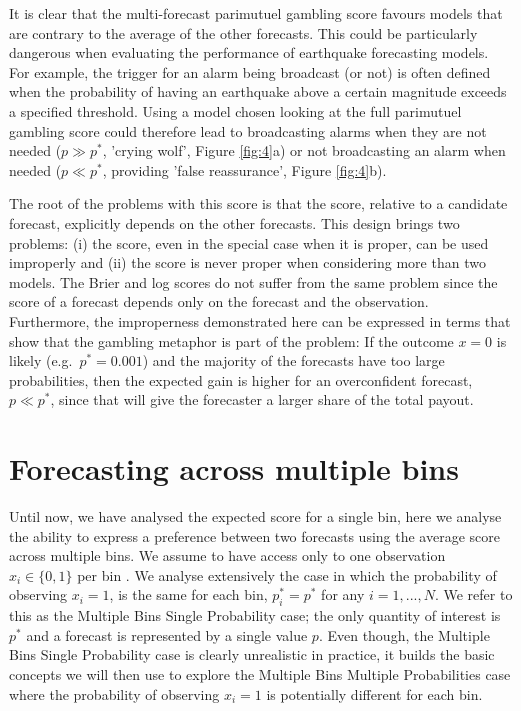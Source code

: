 \documentclass[referee,sn-basic]{sn-jnl}
\theoremstyle{thmstyleone}%
\theoremstyle{thmstyletwo}%
\theoremstyle{thmstylethree}%
\begin{document}
It is clear that the multi-forecast parimutuel gambling score favours models that are contrary to the average of the other forecasts. This could be particularly dangerous when evaluating the performance of earthquake forecasting models. For example, the trigger for an alarm being broadcast (or not) is often defined when the probability of having an earthquake above a certain magnitude exceeds a specified threshold. Using a model chosen looking at the full parimutuel gambling score could therefore lead to broadcasting alarms when they are not needed ($p\gg p^*$, 'crying wolf', Figure \ref{fig:4}a) or not broadcasting an alarm when needed ($p\ll p^*$, providing 'false reassurance', Figure \ref{fig:4}b).

The root of the problems with this score is that the score, relative to a candidate forecast, explicitly depends on the other forecasts. This design brings two problems: (i) the score, even in the special case when it is proper, can be used improperly and (ii) the score is never proper when considering more than two models. The Brier and log scores do not suffer from the same problem since the score of a forecast depends only on the forecast and the observation. Furthermore, the improperness demonstrated here can be expressed in terms that show that the gambling metaphor is part of the problem: If the outcome $x=0$ is likely (e.g.\ $p^* = 0.001$) and the majority of the forecasts have too large probabilities, then the expected gain is higher for an overconfident forecast, $p \ll p^*$, since that will give the forecaster a larger share of the total payout.

\section{ Forecasting across multiple bins }

Until now, we have analysed the expected score for a single bin, here we analyse the ability to express a preference between two forecasts using the average score across multiple bins. We assume to have access only to one observation $x_i \in \{0,1\}$ per bin . We analyse extensively the case in which the probability of observing $x_i = 1$,  is the same for each bin, $p^*_i = p^*$ for any $i = 1,...,N$. We refer to this as the Multiple Bins Single Probability case; the only quantity of interest is $p^*$ and a forecast is represented by a single value $p$. Even though, the Multiple Bins Single Probability case is clearly unrealistic in practice, it builds the basic concepts we will then use to explore the Multiple Bins Multiple Probabilities case where the probability of observing $x_i = 1$ is potentially different for each bin.
\end{document}
